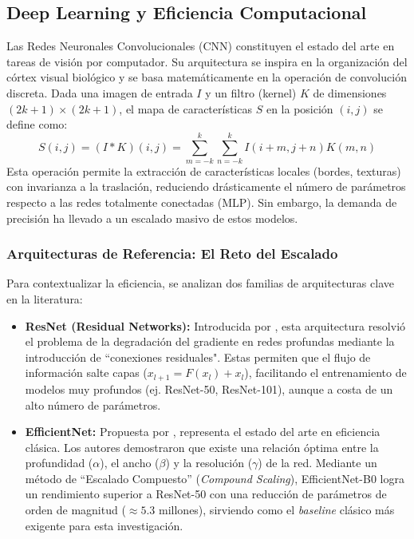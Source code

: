 \documentclass[12pt,letterpaper]{article}
\begin{document}
    \subsection{Deep Learning y Eficiencia Computacional}
    \vspace{-0.5cm}
    Las Redes Neuronales Convolucionales (CNN) constituyen el estado del arte en tareas de visión por computador. Su arquitectura se inspira en la organización del córtex visual biológico y se basa matemáticamente en la operación de convolución discreta. Dada una imagen de entrada $I$ y un filtro (kernel) $K$ de dimensiones $(2k+1) \times (2k+1)$, el mapa de características $S$ en la posición $(i, j)$ se define como:
    \begin{equation}
        S(i, j) = (I * K)(i, j) = \sum_{m=-k}^{k} \sum_{n=-k}^{k} I(i+m, j+n) K(m, n)
    \end{equation}
    Esta operación permite la extracción de características locales (bordes, texturas) con invarianza a la traslación, reduciendo drásticamente el número de parámetros respecto a las redes totalmente conectadas (MLP). Sin embargo, la demanda de precisión ha llevado a un escalado masivo de estos modelos.

    \subsubsection{Arquitecturas de Referencia: El Reto del Escalado}
    \vspace{-0.5cm}
    Para contextualizar la eficiencia, se analizan dos familias de arquitecturas clave en la literatura:
    \begin{itemize}
        \item \textbf{ResNet (Residual Networks):} Introducida por \citet{he2016deep}, esta arquitectura resolvió el problema de la degradación del gradiente en redes profundas mediante la introducción de ``conexiones residuales". Estas permiten que el flujo de información salte capas ($x_{l+1} = F(x_l) + x_l$), facilitando el entrenamiento de modelos muy profundos (ej. ResNet-50, ResNet-101), aunque a costa de un alto número de parámetros.
        \item \textbf{EfficientNet:} Propuesta por \citet{tan2019efficientnet}, representa el estado del arte en eficiencia clásica. Los autores demostraron que existe una relación óptima entre la profundidad ($\alpha$), el ancho ($\beta$) y la resolución ($\gamma$) de la red. Mediante un método de ``Escalado Compuesto'' (\textit{Compound Scaling}), EfficientNet-B0 logra un rendimiento superior a ResNet-50 con una reducción de parámetros de orden de magnitud ($\approx 5.3$ millones), sirviendo como el \textit{baseline} clásico más exigente para esta investigación.
    \end{itemize}
\end{document}
